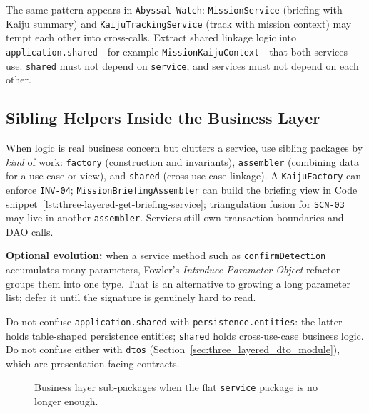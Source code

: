 The same pattern appears in \texttt{Abyssal Watch}: \texttt{MissionService} (briefing with Kaiju summary) and \texttt{KaijuTrackingService} (track with mission context) may tempt each other into cross-calls. Extract shared linkage logic into \texttt{application.shared}---for example \texttt{MissionKaijuContext}---that both services use. \texttt{shared} must not depend on \texttt{service}, and services must not depend on each other.

\subsection{Sibling Helpers Inside the Business Layer}
\label{sec:three_layered_sublayers_roles}

When logic is real business concern but clutters a service, use sibling packages by \textit{kind} of work: \texttt{factory} (construction and invariants), \texttt{assembler} (combining data for a use case or view), and \texttt{shared} (cross-use-case linkage). A \texttt{KaijuFactory} can enforce \texttt{INV-04}; \texttt{MissionBriefingAssembler} can build the briefing view in Code snippet~\ref{lst:three-layered-get-briefing-service}; triangulation fusion for \texttt{SCN-03} may live in another \texttt{assembler}. Services still own transaction boundaries and DAO calls.

\textbf{Optional evolution:} when a service method such as \texttt{confirmDetection} accumulates many parameters, Fowler's \textit{Introduce Parameter Object} refactor groups them into one type.\autocite{fowler2018refactoring} That is an alternative to growing a long parameter list; defer it until the signature is genuinely hard to read. 

Do not confuse \texttt{application.shared} with \texttt{persistence.entities}: the latter holds table-shaped persistence entities; \texttt{shared} holds cross-use-case business logic. Do not confuse either with \texttt{dtos} (Section~\ref{sec:three_layered_dto_module}), which are presentation-facing contracts.

\begin{figure}[h]
\centering
\begin{minipage}{0.8\textwidth}
\end{minipage}
\caption{Business layer sub-packages when the flat \texttt{service} package is no longer enough.}
\label{fig:three_layered_bll_growth}
\end{figure}

